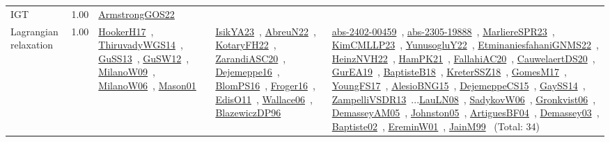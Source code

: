 {\begin{longtable}{p{3cm}r>{\raggedright\arraybackslash}p{6cm}>{\raggedright\arraybackslash}p{6cm}>{\raggedright\arraybackslash}p{8cm}}
\index{IGT}\index{Algorithms!IGT}IGT &  1.00 & \href{../works/ArmstrongGOS22.pdf}{ArmstrongGOS22}~\cite{ArmstrongGOS22} &  & \\
\index{Lagrangian relaxation}\index{Algorithms!Lagrangian relaxation}Lagrangian relaxation &  1.00 & \href{../works/HookerH17.pdf}{HookerH17}~\cite{HookerH17}, \href{../works/ThiruvadyWGS14.pdf}{ThiruvadyWGS14}~\cite{ThiruvadyWGS14}, \href{../works/GuSS13.pdf}{GuSS13}~\cite{GuSS13}, \href{../works/GuSW12.pdf}{GuSW12}~\cite{GuSW12}, \href{../works/MilanoW09.pdf}{MilanoW09}~\cite{MilanoW09}, \href{../works/MilanoW06.pdf}{MilanoW06}~\cite{MilanoW06}, \href{../works/Mason01.pdf}{Mason01}~\cite{Mason01} & \href{../works/IsikYA23.pdf}{IsikYA23}~\cite{IsikYA23}, \href{../works/AbreuN22.pdf}{AbreuN22}~\cite{AbreuN22}, \href{../works/KotaryFH22.pdf}{KotaryFH22}~\cite{KotaryFH22}, \href{../works/ZarandiASC20.pdf}{ZarandiASC20}~\cite{ZarandiASC20}, \href{../works/Dejemeppe16.pdf}{Dejemeppe16}~\cite{Dejemeppe16}, \href{../works/BlomPS16.pdf}{BlomPS16}~\cite{BlomPS16}, \href{../works/Froger16.pdf}{Froger16}~\cite{Froger16}, \href{../works/EdisO11.pdf}{EdisO11}~\cite{EdisO11}, \href{../works/Wallace06.pdf}{Wallace06}~\cite{Wallace06}, \href{../works/BlazewiczDP96.pdf}{BlazewiczDP96}~\cite{BlazewiczDP96} & \href{../works/abs-2402-00459.pdf}{abs-2402-00459}~\cite{abs-2402-00459}, \href{../works/abs-2305-19888.pdf}{abs-2305-19888}~\cite{abs-2305-19888}, \href{../works/MarliereSPR23.pdf}{MarliereSPR23}~\cite{MarliereSPR23}, \href{../works/KimCMLLP23.pdf}{KimCMLLP23}~\cite{KimCMLLP23}, \href{../works/YunusogluY22.pdf}{YunusogluY22}~\cite{YunusogluY22}, \href{../works/EtminaniesfahaniGNMS22.pdf}{EtminaniesfahaniGNMS22}~\cite{EtminaniesfahaniGNMS22}, \href{../works/HeinzNVH22.pdf}{HeinzNVH22}~\cite{HeinzNVH22}, \href{../works/HamPK21.pdf}{HamPK21}~\cite{HamPK21}, \href{../works/FallahiAC20.pdf}{FallahiAC20}~\cite{FallahiAC20}, \href{../works/CauwelaertDS20.pdf}{CauwelaertDS20}~\cite{CauwelaertDS20}, \href{../works/GurEA19.pdf}{GurEA19}~\cite{GurEA19}, \href{../works/BaptisteB18.pdf}{BaptisteB18}~\cite{BaptisteB18}, \href{../works/KreterSSZ18.pdf}{KreterSSZ18}~\cite{KreterSSZ18}, \href{../works/GomesM17.pdf}{GomesM17}~\cite{GomesM17}, \href{../works/YoungFS17.pdf}{YoungFS17}~\cite{YoungFS17}, \href{../works/AlesioBNG15.pdf}{AlesioBNG15}~\cite{AlesioBNG15}, \href{../works/DejemeppeCS15.pdf}{DejemeppeCS15}~\cite{DejemeppeCS15}, \href{../works/GaySS14.pdf}{GaySS14}~\cite{GaySS14}, \href{../works/ZampelliVSDR13.pdf}{ZampelliVSDR13}~\cite{ZampelliVSDR13}...\href{../works/LauLN08.pdf}{LauLN08}~\cite{LauLN08}, \href{../works/SadykovW06.pdf}{SadykovW06}~\cite{SadykovW06}, \href{../works/Gronkvist06.pdf}{Gronkvist06}~\cite{Gronkvist06}, \href{../works/DemasseyAM05.pdf}{DemasseyAM05}~\cite{DemasseyAM05}, \href{../works/Johnston05.pdf}{Johnston05}~\cite{Johnston05}, \href{../works/ArtiguesBF04.pdf}{ArtiguesBF04}~\cite{ArtiguesBF04}, \href{../works/Demassey03.pdf}{Demassey03}~\cite{Demassey03}, \href{../works/Baptiste02.pdf}{Baptiste02}~\cite{Baptiste02}, \href{../works/EreminW01.pdf}{EreminW01}~\cite{EreminW01}, \href{../works/JainM99.pdf}{JainM99}~\cite{JainM99} (Total: 34)\\

\end{longtable}}
